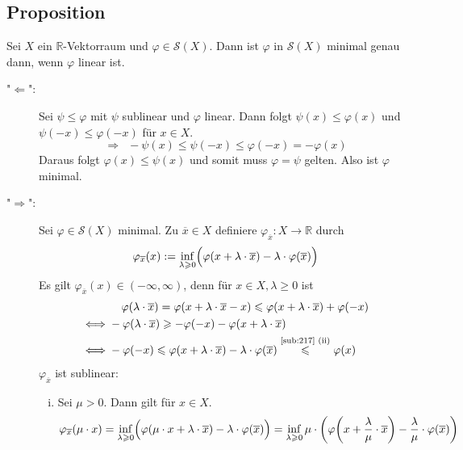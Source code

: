 \subsection[Propostion: Minimale Elemente in $\mathcal{S}(X)$ sind genau die lineare Abbildungen]{Proposition} %
\label{sub:220}
Sei $X$ ein $\mathds{R}$-Vektorraum und $\varphi \in \mathcal{S}(X)$. Dann ist $\varphi$ in $\mathcal{S}(X)$ minimal genau dann, wenn $\varphi$ linear ist.
\begin{description}
	\item["$\Leftarrow$":] Sei $\psi \le \varphi$ mit $\psi$ sublinear und $\varphi$ linear. Dann folgt $\psi(x) \le \varphi(x)$ und $\psi(-x) \le \varphi(-x)$ für 
	$x \in X$.
	\[
		 \Longrightarrow \enspace- \psi(x) \le \psi(-x) \le \varphi(-x) = - \varphi(x)
	\]
	Daraus folgt $\varphi(x) \le \psi(x)$ und somit muss $\varphi=\psi$ gelten. Also ist $\varphi$ minimal.
	\item["$\Rightarrow $":] Sei $\varphi \in \mathcal{S}(X)$ minimal. Zu $\overline{x} \in X$ definiere $\varphi_{\overline{x}} \colon X \to \mathds{R}$ durch
	\[
		\varphi_{\overline{x}}(x) := \inf_{\lambda \ge 0} \enbrace[\Big]{\varphi \enbrace*{x+ \lambda \cdot \overline{x} } - \lambda \cdot \varphi(\overline{x})}
	\]
	Es gilt $\varphi_{\overline{x}}(x) \in (-\infty,\infty)$, denn für $x \in X, \lambda \ge 0$ ist
	\begin{align*}
		&\hphantom{-}\,\, \varphi(\lambda \cdot \overline{x}) = \varphi(x+ \lambda \cdot \overline{x} -x ) \le \varphi(x + \lambda \cdot \overline{x}) + \varphi(-x)\\
		\iff &- \varphi(\lambda \cdot \overline{x}) \ge - \varphi(-x) - \varphi(x + \lambda \cdot \overline{x}) \\
		\iff & - \varphi(-x) \le \varphi(x + \lambda \cdot \overline{x}) - \lambda \cdot \varphi(\overline{x} ) \stackrel{\mbox{\scriptsize \ref{sub:217} (ii)}}{\le} \varphi(x)
	\end{align*}
	$\varphi_{\overline{x}}$ ist sublinear:
	\begin{enumerate}[(i)]
		\item Sei $\mu >0$. Dann gilt für $x \in X$.
		\begin{align*}
			\varphi_{\overline{x}}(\mu \cdot x) = \inf_{\lambda \ge 0} \enbrace[\Big]{ \varphi \enbrace*{\mu \cdot x + \lambda  \cdot \overline{x} } 
			- \lambda \cdot \varphi(\overline{x} )} &= \inf_{\lambda \ge 0 } \mu \cdot  \enbrace*{ \varphi \enbrace*{x + \frac{\lambda }{\mu} \cdot \overline{x}}
			- \frac{\lambda }{\mu} \cdot \varphi(\overline{x} )  } \\

\end{align*}
\end{enumerate}
\end{description}
